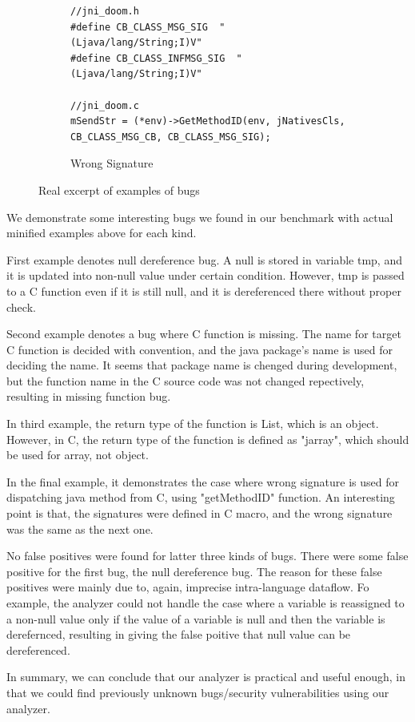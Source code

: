\begin{figure}[t]
\begin{subfigure}[t]{0.5\textwidth}
\begin{lstlisting}[style=cpp,xleftmargin=2.5em]
//jni_doom.h
#define CB_CLASS_MSG_SIG  "(Ljava/lang/String;I)V"
#define CB_CLASS_INFMSG_SIG  "(Ljava/lang/String;I)V"

//jni_doom.c
mSendStr = (*env)->GetMethodID(env, jNativesCls, CB_CLASS_MSG_CB, CB_CLASS_MSG_SIG);

    \end{lstlisting}
    \vspace*{-.5em}
    \caption{Wrong Signature}
    \label{fig:bug3}
  \end{subfigure}
  \vspace*{-.5em}
  \caption{Real excerpt of examples of bugs}
  \label{fig:bugs}
\end{figure}

We demonstrate some interesting bugs we found in our benchmark with actual minified examples above
for each kind.

First example denotes null dereference bug. A null is stored in variable tmp, and
it is updated into non-null value under certain condition. However, tmp is passed
to a C function even if it is still null, and it is dereferenced there
without proper check.

Second example denotes a bug where C function is missing. The name for target C
function is decided with convention, and the java package's name is used
for deciding the name. It seems that package name is chenged during development,
but the function name in the C source code was not changed repectively, resulting
in missing function bug.

In third example, the return type of the function is List, which is an object.
However, in C, the return type of the function is defined as "jarray", which
should be used for array, not object.

In the final example, it demonstrates the case where wrong signature is used
for dispatching java method from C, using "getMethodID" function. An interesting
point is that, the signatures were defined in C macro, and the wrong signature
was the same as the next one.

No false positives were found for latter three kinds of bugs.  There were some
false positive for the first bug, the null dereference bug. The reason for
these false positives were mainly due to, again, imprecise intra-language
dataflow. Fo example, the analyzer could not handle the case where a variable
is reassigned to a non-null value only if the value of a variable is null and
then the variable is derefernced, resulting in giving the false poitive that
null value can be dereferenced.

In summary, we can conclude that our analyzer is practical and useful enough,
in that we could find previously unknown bugs/security vulnerabilities using
our analyzer.
